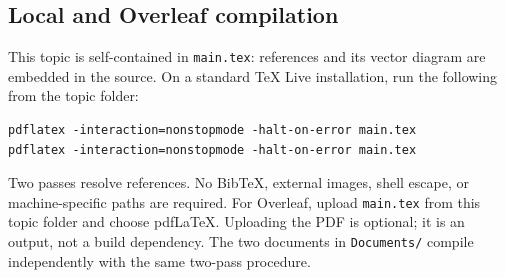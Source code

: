 \documentclass[11pt,letterpaper]{article}
\begin{document}
\subsection*{Local and Overleaf compilation}
This topic is self-contained in \texttt{main.tex}: references and its vector diagram are embedded in the source. On a standard TeX Live installation, run the following from the topic folder:
\begin{verbatim}
pdflatex -interaction=nonstopmode -halt-on-error main.tex
pdflatex -interaction=nonstopmode -halt-on-error main.tex
\end{verbatim}
Two passes resolve references. No BibTeX, external images, shell escape, or machine-specific paths are required. For Overleaf, upload \texttt{main.tex} from this topic folder and choose pdfLaTeX. Uploading the PDF is optional; it is an output, not a build dependency. The two documents in \texttt{Documents/} compile independently with the same two-pass procedure.
\end{document}
